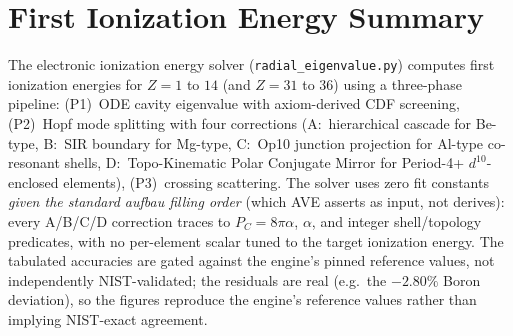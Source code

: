 \section*{First Ionization Energy Summary}

The electronic ionization energy solver (\texttt{radial\_eigenvalue.py}) computes first ionization energies for $Z = 1$ to $14$ (and $Z = 31$ to $36$) using a three-phase pipeline: (P1)~ODE cavity eigenvalue with axiom-derived CDF screening, (P2)~Hopf mode splitting with four corrections (A:~hierarchical cascade for Be-type, B:~SIR boundary for Mg-type, C:~Op10 junction projection for Al-type co-resonant shells, D:~Topo-Kinematic Polar Conjugate Mirror for Period-4+ $d^{10}$-enclosed elements), (P3)~crossing scattering.  The solver uses zero fit constants \emph{given the standard aufbau filling order} (which AVE asserts as input, not derives): every A/B/C/D correction traces to $P_C = 8\pi\alpha$, $\alpha$, and integer shell/topology predicates, with no per-element scalar tuned to the target ionization energy. The tabulated accuracies are gated against the engine's pinned reference values, not independently NIST-validated; the residuals are real (e.g.\ the $-2.80\%$ Boron deviation), so the figures reproduce the engine's reference values rather than implying NIST-exact agreement.

